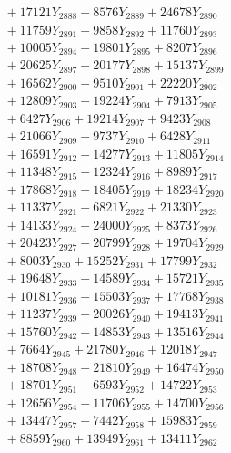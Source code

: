 \documentclass[a4paper,10pt]{article}
\begin{document}
{\begin{align}
&\;  + 17121 Y_{2888} + 8576 Y_{2889} + 24678 Y_{2890} \\[0.3ex]
&\;  + 11759 Y_{2891} + 9858 Y_{2892} + 11760 Y_{2893} \\[0.3ex]
&\;  + 10005 Y_{2894} + 19801 Y_{2895} + 8207 Y_{2896} \\[0.3ex]
&\;  + 20625 Y_{2897} + 20177 Y_{2898} + 15137 Y_{2899} \\[0.3ex]
&\;  + 16562 Y_{2900} + 9510 Y_{2901} + 22220 Y_{2902} \\[0.3ex]
&\;  + 12809 Y_{2903} + 19224 Y_{2904} + 7913 Y_{2905} \\[0.3ex]
&\;  + 6427 Y_{2906} + 19214 Y_{2907} + 9423 Y_{2908} \\[0.5ex]\allowbreak
&\;  + 21066 Y_{2909} + 9737 Y_{2910} + 6428 Y_{2911} \\[0.3ex]
&\;  + 16591 Y_{2912} + 14277 Y_{2913} + 11805 Y_{2914} \\[0.3ex]
&\;  + 11348 Y_{2915} + 12324 Y_{2916} + 8989 Y_{2917} \\[0.3ex]
&\;  + 17868 Y_{2918} + 18405 Y_{2919} + 18234 Y_{2920} \\[0.3ex]
&\;  + 11337 Y_{2921} + 6821 Y_{2922} + 21330 Y_{2923} \\[0.3ex]
&\;  + 14133 Y_{2924} + 24000 Y_{2925} + 8373 Y_{2926} \\[0.3ex]
&\;  + 20423 Y_{2927} + 20799 Y_{2928} + 19704 Y_{2929} \\[0.3ex]
&\;  + 8003 Y_{2930} + 15252 Y_{2931} + 17799 Y_{2932} \\[0.3ex]
&\;  + 19648 Y_{2933} + 14589 Y_{2934} + 15721 Y_{2935} \\[0.3ex]
&\;  + 10181 Y_{2936} + 15503 Y_{2937} + 17768 Y_{2938} \\[0.5ex]\allowbreak
&\;  + 11237 Y_{2939} + 20026 Y_{2940} + 19413 Y_{2941} \\[0.3ex]
&\;  + 15760 Y_{2942} + 14853 Y_{2943} + 13516 Y_{2944} \\[0.3ex]
&\;  + 7664 Y_{2945} + 21780 Y_{2946} + 12018 Y_{2947} \\[0.3ex]
&\;  + 18708 Y_{2948} + 21810 Y_{2949} + 16474 Y_{2950} \\[0.3ex]
&\;  + 18701 Y_{2951} + 6593 Y_{2952} + 14722 Y_{2953} \\[0.3ex]
&\;  + 12656 Y_{2954} + 11706 Y_{2955} + 14700 Y_{2956} \\[0.3ex]
&\;  + 13447 Y_{2957} + 7442 Y_{2958} + 15983 Y_{2959} \\[0.3ex]
&\;  + 8859 Y_{2960} + 13949 Y_{2961} + 13411 Y_{2962} \\[0.3ex]

\end{align}}
\end{document}
